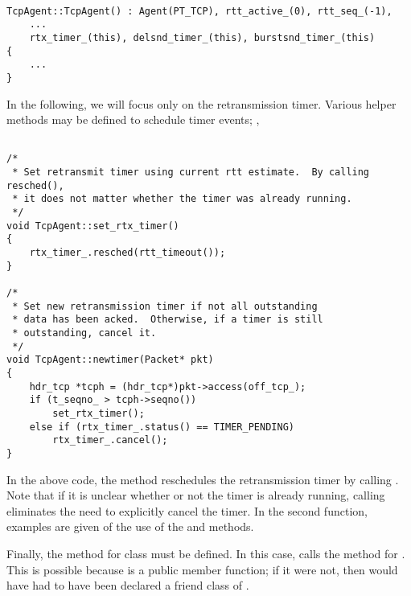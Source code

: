 \begin{small}
\begin{verbatim}

TcpAgent::TcpAgent() : Agent(PT_TCP), rtt_active_(0), rtt_seq_(-1), 
    ...
    rtx_timer_(this), delsnd_timer_(this), burstsnd_timer_(this)
{
    ...
}

\end{verbatim}
\end{small}

In the following, we will focus only on the retransmission timer.  Various
helper methods may be defined to schedule timer events; \eg,

\begin{small}
\begin{verbatim}

/*
 * Set retransmit timer using current rtt estimate.  By calling resched(),
 * it does not matter whether the timer was already running.
 */
void TcpAgent::set_rtx_timer()
{
    rtx_timer_.resched(rtt_timeout());
}

/*
 * Set new retransmission timer if not all outstanding
 * data has been acked.  Otherwise, if a timer is still
 * outstanding, cancel it.
 */
void TcpAgent::newtimer(Packet* pkt)
{
    hdr_tcp *tcph = (hdr_tcp*)pkt->access(off_tcp_);
    if (t_seqno_ > tcph->seqno())
        set_rtx_timer();
    else if (rtx_timer_.status() == TIMER_PENDING)
        rtx_timer_.cancel();
}

\end{verbatim}
\end{small}

In the above code, the  method reschedules the 
retransmission timer by calling .  Note that if
it is unclear whether or not the timer is already running, calling
 eliminates the need to explicitly cancel the timer.  In
the second function, examples are given of the use of the 
and  methods.

Finally, the  method for class  must be 
defined.  In this case,  calls the  method
for .  This is possible because  is a 
public member function; if it were not, then  would have
had to have been declared a friend class of .


